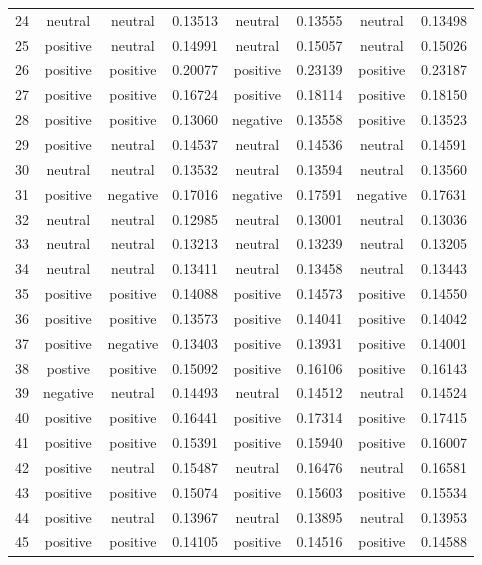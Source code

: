 \begin{center}
\begin{footnotesize}
\begin{longtable}{cc | cc | cc | cc}
24 & neutral & neutral & 0.13513 & neutral & 0.13555 & neutral & 0.13498 \\
25 & positive & neutral & 0.14991 & neutral & 0.15057 & neutral & 0.15026 \\
26 & positive & positive & 0.20077 & positive & 0.23139 & positive & 0.23187 \\
27 & positive & positive & 0.16724 & positive & 0.18114 & positive & 0.18150 \\
28 & positive & positive & 0.13060 & negative & 0.13558 & positive & 0.13523 \\
29 & positive & neutral & 0.14537 & neutral & 0.14536 & neutral & 0.14591 \\
30 & neutral & neutral & 0.13532 & neutral & 0.13594 & neutral & 0.13560 \\
31 & positive & negative & 0.17016 & negative & 0.17591 & negative & 0.17631 \\
32 & neutral & neutral & 0.12985 & neutral & 0.13001 & neutral & 0.13036 \\
33 & neutral & neutral & 0.13213 & neutral & 0.13239 & neutral & 0.13205 \\
34 & neutral & neutral & 0.13411 & neutral & 0.13458 & neutral & 0.13443 \\
35 & positive & positive & 0.14088 & positive & 0.14573 & positive & 0.14550 \\
36 & positive & positive & 0.13573 & positive & 0.14041 & positive & 0.14042 \\
37 & positive & negative & 0.13403 & positive & 0.13931 & positive & 0.14001 \\
38 & postive & positive & 0.15092 & positive & 0.16106 & positive & 0.16143 \\
39 & negative & neutral & 0.14493 & neutral & 0.14512 & neutral & 0.14524 \\
40 & positive & positive & 0.16441 & positive & 0.17314 & positive & 0.17415 \\
41 & positive & positive & 0.15391 & positive & 0.15940 & positive & 0.16007 \\
42 & positive & neutral & 0.15487 & neutral & 0.16476 & neutral & 0.16581 \\
43 & positive & positive & 0.15074 & positive & 0.15603 & positive & 0.15534 \\
44 & positive & neutral & 0.13967 & neutral & 0.13895 & neutral & 0.13953 \\
45 & positive & positive & 0.14105 & positive & 0.14516 & positive & 0.14588 \\

\end{longtable}
\end{footnotesize}
\end{center}

